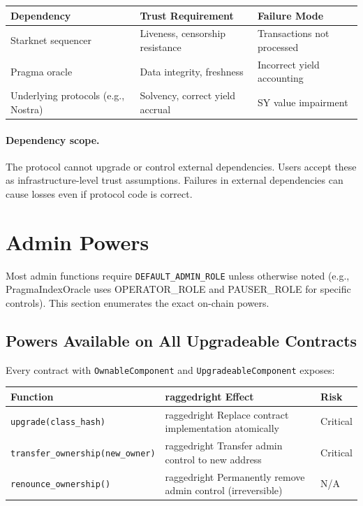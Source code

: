 \begin{center}
\begin{tabular}{l l l}
\toprule
\textbf{Dependency} & \textbf{Trust Requirement} & \textbf{Failure Mode} \\
\midrule
Starknet sequencer & Liveness, censorship resistance & Transactions not processed \\
Pragma oracle & Data integrity, freshness & Incorrect yield accounting \\
Underlying protocols (e.g., Nostra) & Solvency, correct yield accrual & SY value impairment \\
\bottomrule
\end{tabular}
\end{center}

\paragraph{Dependency scope.}
The protocol cannot upgrade or control external dependencies. Users accept these as infrastructure-level trust assumptions. Failures in external dependencies can cause losses even if protocol code is correct.


\section{Admin Powers}

Most admin functions require \texttt{DEFAULT\_ADMIN\_ROLE} unless otherwise noted (e.g., PragmaIndexOracle uses OPERATOR\_ROLE and PAUSER\_ROLE for specific controls). This section enumerates the exact on-chain powers.

\subsection{Powers Available on All Upgradeable Contracts}

Every contract with \texttt{OwnableComponent} and \texttt{UpgradeableComponent} exposes:

\begin{center}
\begin{tabularx}{\textwidth}{l >{raggedright\arraybackslash}X l}
\toprule
\textbf{Function} & \textbf{Effect} & \textbf{Risk} \\
\midrule
\texttt{upgrade(class\_hash)} & Replace contract implementation atomically & Critical \\
\texttt{transfer\_ownership(new\_owner)} & Transfer admin control to new address & Critical \\
\texttt{renounce\_ownership()} & Permanently remove admin control (irreversible) & N/A \\
\bottomrule
\end{tabularx}
\end{center}

